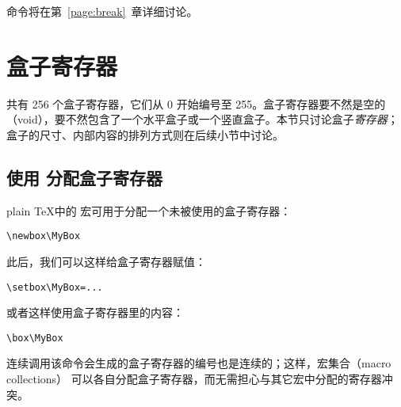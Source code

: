 \documentclass{book}
\begin{document}
 命令将在第~\ref{page:break}~章详细讨论。

\section{盒子寄存器}

共有 256 个盒子寄存器，它们从 0 开始编号至 255。盒子寄存器要不然是空的（void），要不然包含了一个水平盒子或一个竖直盒子。本节只讨论盒子\emph{寄存器}；盒子的尺寸、内部内容的排列方式则在后续小节中讨论。

\subsection{使用  分配盒子寄存器}

plain \TeX 中的  宏可用于分配一个未被使用的盒子寄存器：
\begin{verbatim}
\newbox\MyBox
\end{verbatim}
此后，我们可以这样给盒子寄存器赋值：
\begin{verbatim}
\setbox\MyBox=...
\end{verbatim}
或者这样使用盒子寄存器里的内容：
\begin{verbatim}
\box\MyBox
\end{verbatim}
连续调用该命令会生成的盒子寄存器的编号也是连续的；这样，宏集合（macro collections）%
可以各自分配盒子寄存器，而无需担心与其它宏中分配的寄存器冲突。
\end{document}
